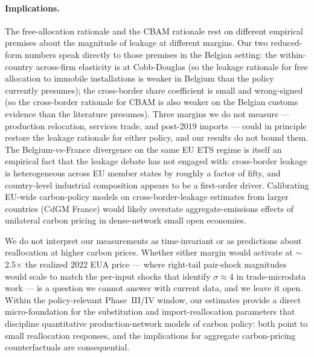 \paragraph{Implications.} The free-allocation rationale and the CBAM rationale rest on different empirical premises about the magnitude of leakage at different margins. Our two reduced-form numbers speak directly to those premises in the Belgian setting: the within-country across-firm elasticity is at Cobb-Douglas (so the leakage rationale for free allocation to immobile installations is weaker in Belgium than the policy currently presumes); the cross-border share coefficient is small and wrong-signed (so the cross-border rationale for CBAM is also weaker on the Belgian customs evidence than the literature presumes). Three margins we do not measure --- production relocation, services trade, and post-2019 imports --- could in principle restore the leakage rationale for either policy, and our results do not bound them. The Belgium-vs-France divergence on the same EU ETS regime is itself an empirical fact that the leakage debate has not engaged with: cross-border leakage is heterogeneous across EU member states by roughly a factor of fifty, and country-level industrial composition appears to be a first-order driver. Calibrating EU-wide carbon-policy models on cross-border-leakage estimates from larger countries (CdGM France) would likely overstate aggregate-emissions effects of unilateral carbon pricing in dense-network small open economies.

We do not interpret our measurements as time-invariant or as predictions about reallocation at higher carbon prices. Whether either margin would activate at $\sim$2.5$\times$ the realized 2022 EUA price --- where right-tail pair-shock magnitudes would scale to match the per-input shocks that identify $\sigma \approx 4$ in trade-microdata work --- is a question we cannot answer with current data, and we leave it open. Within the policy-relevant Phase~III/IV window, our estimates provide a direct micro-foundation for the substitution and import-reallocation parameters that discipline quantitative production-network models of carbon policy: both point to small reallocation responses, and the implications for aggregate carbon-pricing counterfactuals are consequential.
